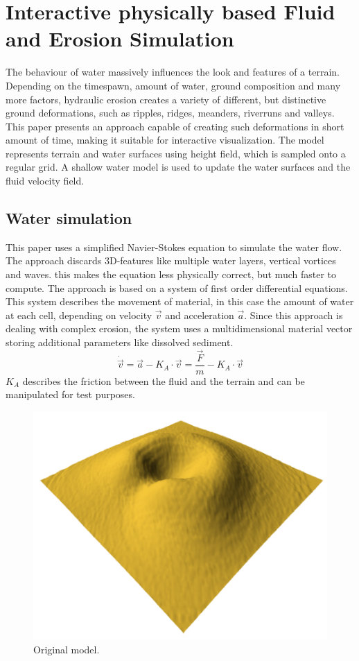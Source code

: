 \section{Interactive physically based Fluid and Erosion Simulation}

The behaviour of water massively influences the look and features of a terrain. Depending on the timespawn, amount of water, ground composition and many more factors, hydraulic erosion creates a variety of different, but distinctive ground deformations, such as ripples, ridges, meanders, riverruns and valleys. 
This paper \cite{Neidhold:2005:IPB:2381356.2381361} presents an approach capable of creating such deformations in short amount of time, making it suitable for interactive visualization. The model represents terrain and water surfaces using height field, which is sampled onto a regular grid. A shallow water model is used to update the water surfaces and the fluid velocity field. 

\subsection{Water simulation}
This paper uses a simplified Navier-Stokes equation to simulate the water flow. The approach discards 3D-features like multiple water layers, vertical vortices and waves. this makes the equation less physically correct, but much faster to compute. The approach is based on a system of first order differential equations. This system describes the movement of material, in this case the amount of water at each cell, depending on velocity $\vec{v}$ and acceleration $\vec{a}$. Since this approach is dealing with complex erosion, the system uses a multidimensional material vector storing additional parameters like dissolved sediment.
$$\dot{\vec{v}} = \vec{a} -K_A \cdot \vec{v}=\frac{\vec{F}}{m} - K_A\cdot \vec{v}$$
$K_A$ describes the friction between the fluid and the terrain and can be manipulated for test purposes. 

\begin{figure}
	\centering
	\includegraphics[width=\linewidth]{NWD05/hydraulic_errosion_a}
	\caption{Original model.}
	\label{fig:orig_model}
\end{figure}

